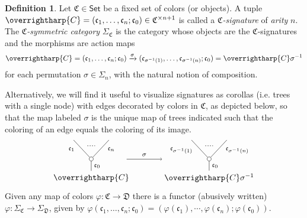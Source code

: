 \documentclass[a4paper,10pt
,draft
]{article}%
\numberwithin{equation}{section}
\numberwithin{figure}{section}
\theoremstyle{definition} %
\newtheorem{definition}[equation]{Definition}%
\newcommand{\vect}[1]{\text{\overrightharp{\ensuremath{#1}}}}
\newcommand{\1}{\ensuremath{\mathbbm 1}}%
\begin{document}
\begin{definition}\label{CSYM DEF}
	Let $\mathfrak {C} \in \mathsf{Set}$ be a fixed set of colors (or objects).
	A tuple
    $\vect C = (\mathfrak c_1, \dots, \mathfrak c_n; \mathfrak c_0) \in \mathfrak{C}^{\times n+1}$
	is called a \textit{$\mathfrak {C}$-signature} of \textit{arity} $n$.
	The \textit{$\mathfrak C$-symmetric category} $\Sigma_{\mathfrak C}$ is the category whose objects are the $\mathfrak{C}$-signatures and the morphisms are action maps
\begin{equation}\label{CSYM EQ1}
\vect{C} =
(\mathfrak c_1, \dots, \mathfrak c_n; \mathfrak c_0) \xrightarrow{\sigma} (\mathfrak c_{\sigma^{-1}(1)}, \dots, \mathfrak c_{\sigma^{-1}(n)}; \mathfrak c_0)
= \vect{C} \sigma^{-1}
\end{equation}
for each permutation $\sigma \in \Sigma_n$, with the natural notion of composition.

	Alternatively, we will find it useful to visualize signatures as corollas (i.e. trees with a single node)
	with edges decorated by colors in $\mathfrak{C}$, as depicted below, so that the map labeled $\sigma$
        is the unique map of trees indicated such that the coloring of an edge equals the coloring of its image.
\begin{equation}\label{CSYM EQ2}
\begin{tikzpicture}
      [grow=up,auto,level distance=2.3em,every node/.style = {font=\footnotesize},dummy/.style={circle,draw,inner sep=0pt,minimum size=1.75mm}]
      
      \node at (0,0) [font=\normalsize]{$\vect{C}$}
		child{node [dummy] {}
			child{
			edge from parent node [swap,near end] {$\mathfrak c_n$} node [name=Kn] {}}
			child{
			edge from parent node [near end] {$\mathfrak c_1$}
node [name=Kone,swap] {}}
		edge from parent node [swap] {$\mathfrak c_0$}
		};
		\draw [dotted,thick] (Kone) -- (Kn) ;
	\node at (5,0) [font=\normalsize] {$\vect{C} \sigma^{-1}
	$}
		child{node [dummy] {}
			child{
			edge from parent node [swap,near end] {$\mathfrak c_{\sigma^{-1}(n)}$} node [name=Kn] {}}
			child{
			edge from parent node [near end] {$\mathfrak c_{\sigma^{-1}(1)}$}
node [name=Kone,swap] {}}
		edge from parent node [swap] {$\mathfrak c_0$}
		};
		\draw [dotted,thick] (Kone) -- (Kn) ;

\draw[->] (1.5,0.8) -- node{$\sigma$} (3,0.8);
\end{tikzpicture}
\end{equation}
Given any map of colors $\varphi \colon \mathfrak{C} \to \mathfrak{D}$ there is a functor (abusively written)
$\varphi \colon \Sigma_{\mathfrak{C}} \to \Sigma_{\mathfrak{D}}$,
given by 
$\varphi (\mathfrak c_1, \dots, \mathfrak c_n; \mathfrak c_0) = (\varphi(\mathfrak c_1),\cdots,\varphi(\mathfrak c_n);\varphi(\mathfrak c_0))$. 
\end{definition}
\end{document}
